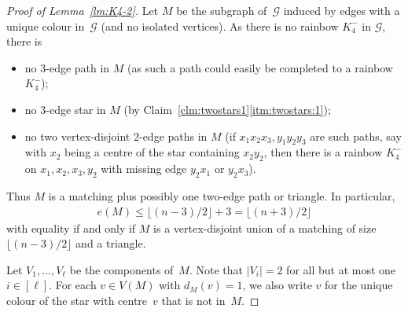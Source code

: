 \documentclass[a4paper, 12pt]{article}
\numberwithin{equation}{section}
\newcommand{\ms}[1]{\mathscr{#1}}
\begin{document}
\begin{proof}[Proof of Lemma~\ref{lm:K4-2}]
\medskip
\noindent
Let $M$ be the subgraph of~$\ms{G}$ induced by edges with a unique colour in~$\ms{G}$ (and no isolated vertices).
As there is no rainbow $K_4^-$ in $\ms{G}$, there is
\begin{itemize}
\item no $3$-edge path in $M$ 
(as such a path could easily be completed to a rainbow $K_4^-$);%
\item no $3$-edge star in $M$ (by Claim~\ref{clm:twostars1}\ref{itm:twostars:1});
\item no two vertex-disjoint $2$-edge paths in $M$ (if $x_1x_2x_3,y_1y_2y_3$ are such paths, say with  $x_2$ being a centre of the star containing $x_2y_2$, then there is a rainbow $K_4^-$ on $x_1,x_2,x_3,y_2$ with missing edge $y_2x_1$ or $y_2x_3$).
\end{itemize}
Thus $M$ is a matching plus possibly one two-edge path or triangle.
In particular, 
\begin{align}
	e(M) \leq \lfloor(n-3)/2\rfloor + 3 = \lfloor(n+3)/2\rfloor \label{eqn:Mupper}
\end{align}
 with equality if and only if $M$ is a vertex-disjoint union of a matching of size~$\lfloor (n-3)/2 \rfloor$ and a triangle.

Let $V_1, \dots, V_{\ell}$ be the components of~$M$.
Note that $|V_i| = 2$ for all but at most one $i \in [\ell]$.
For each $v \in V(M)$ with $d_M(v) =1$, we also write $v$ for the unique colour of the star with centre~$v$ that is not in~$M$.


\end{proof}
\end{document}
